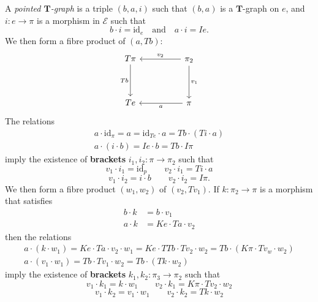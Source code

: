 \documentclass{article}
\newcommand{\oldpage}[1]{\marginpar{\footnotesize$\Big\vert$ \textit{p.~#1}}}
\newcommand{\unsure}[1]{{\color{purple}\textbf{#1}}}
\newcommand{\id}{\mathrm{id}}
\newcommand{\TT}{\mathbf{T}}
\newcommand{\textand}{\quad\text{and}\quad}
\newcommand{\cat}[1]{\mathcal{#1}}
\begin{document}
A \emph{pointed $\TT$-graph} is a triple $(b,a,i)$ such that $(b,a)$ is a $\TT$-graph on $e$, and $i\colon e\to\pi$ is a morphism in $\cat{E}$ such that
\[
  b\cdot i = \id_e
  \textand
  a\cdot i= Ie.
  \tag{1}
\]
We then form a fibre product of $(a,Tb)$:
\[
  \begin{tikzcd}[sep=huge]
    T\pi
      \ar[d,swap,"Tb"]
  & \pi_2
      \ar[l,swap,"v_2"]
      \ar[d,"v_1"]
  \\Te
  & \pi
      \ar[l,"a"]
  \end{tikzcd}
\]
The relations
\[
  \begin{gathered}
    a\cdot\id_\pi
    = a
    = \id_{Te}\cdot a
    = Tb\cdot(Ti\cdot a)
  \\a\cdot(i\cdot b)
    = Ie\cdot b
    = Tb\cdot I\pi
  \end{gathered}
\]
imply the existence of \unsure{brackets} $i_1,i_2\colon\pi\to\pi_2$ such that
\[
  v_1\cdot i_1
  = \id_p
  \qquad
  v_2\cdot i_1
  = Ti\cdot a
  \tag{2}
\]
\[
  v_1\cdot i_2
  = i\cdot b
  \qquad
  v_2\cdot i_2
  = I\pi.
  \tag{3}
\]
\oldpage{226}
We then form a fibre product $(w_1,w_2)$ of $(v_2,Tv_1)$.
If $k\colon\pi_2\to\pi$ is a morphism that satisfies
\[
  \begin{aligned}
    b\cdot k
    &= b\cdot v_1
  \\a\cdot k
    &= Ke\cdot Ta\cdot v_2
  \end{aligned}
  \tag{4}
\]
then the relations
\[
  \begin{gathered}
    a\cdot(k\cdot w_1)
    = Ke\cdot Ta\cdot v_2\cdot w_1
    = Ke\cdot TTb\cdot Tv_2\cdot w_2
    = Tb\cdot(K\pi\cdot Tv_w\cdot w_2)
  \\a\cdot(v_1\cdot w_1)
    = Tb\cdot Tv_1\cdot w_2
    = Tb\cdot (Tk\cdot w_2)
  \end{gathered}
\]
imply the existence of \unsure{brackets} $k_1,k_2\colon\pi_3\to\pi_2$ such that
\[
  v_1\cdot k_1
  = k\cdot w_1
  \qquad
  v_2\cdot k_1
  = K\pi\cdot Tv_2\cdot w_2
  \tag{5}
\]
\[
  v_1\cdot k_2
  = v_1\cdot w_1
  \qquad
  v_2\cdot k_2
  = Tk\cdot w_2
  \tag{6}
\]
\end{document}
